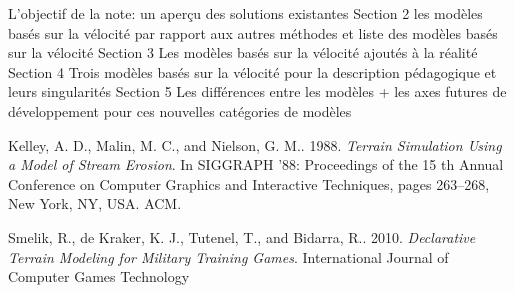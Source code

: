 \documentclass[11pt]{report}
\begin{document}
L'objectif de la note: un aperçu des solutions existantes
Section 2 les modèles basés sur la vélocité par rapport aux autres méthodes et liste des modèles basés sur la vélocité
Section 3 Les modèles basés sur la vélocité ajoutés à la réalité
Section 4 Trois modèles basés sur la vélocité pour la description pédagogique et leurs singularités
Section 5 Les différences entre les modèles + les axes futures de développement pour ces nouvelles catégories de modèles



\newpage
\begin{thebibliography}{2} 

Kelley, A. D., Malin, M. C., and Nielson, G. M.. 1988.
\textit{Terrain Simulation Using a Model of Stream Erosion}.
In SIGGRAPH ’88: Proceedings of the 15 th Annual Conference on Computer
Graphics and Interactive Techniques, pages 263–268, New York, NY, USA. ACM.

Smelik, R., de Kraker, K. J., Tutenel, T., and Bidarra, R.. 2010.
\textit{Declarative Terrain Modeling for Military Training Games}.
International Journal of Computer Games Technology



\end{thebibliography}
\end{document}
